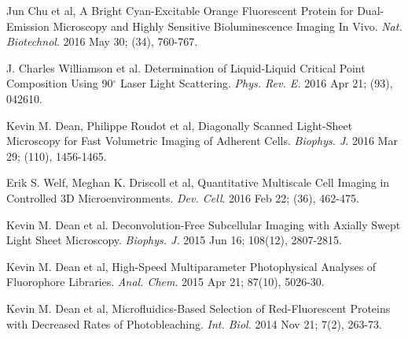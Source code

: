 \documentclass[10pt]{res}
\begin{document}
\begin{resume}
\begin{etaremune}
\item Jun Chu et al,  A Bright Cyan-Excitable Orange Fluorescent Protein for Dual-Emission Microscopy and Highly Sensitive Bioluminescence Imaging In Vivo.  {\it Nat. Biotechnol}. 2016 May 30; (34), 760-767.

\item J. Charles Williamson et al.  Determination of Liquid-Liquid Critical Point Composition Using 90$^{\circ}$ Laser Light Scattering. {\it Phys. Rev. E.}  2016 Apr 21; (93), 042610.

\item Kevin M. Dean, Philippe Roudot et al,  Diagonally Scanned Light-Sheet Microscopy for Fast Volumetric Imaging of Adherent Cells.  {\it Biophys. J}.  2016 Mar 29; (110), 1456-1465. 

\item Erik S. Welf, Meghan K. Driscoll et al, Quantitative Multiscale Cell Imaging in Controlled 3D Microenvironments. {\it Dev. Cell}.  2016 Feb 22; (36), 462-475. 

\item Kevin M. Dean et al.  Deconvolution-Free Subcellular Imaging with Axially Swept Light Sheet Microscopy.  {\it Biophys. J.} 2015 Jun 16; 108(12), 2807-2815.

\item Kevin M. Dean et al,  High-Speed Multiparameter Photophysical Analyses  of Fluorophore Libraries. {\it Anal. Chem}.  2015 Apr 21; 87(10), 5026-30.

\item Kevin M. Dean et al, Microfluidics-Based Selection of Red-Fluorescent Proteins with Decreased Rates of Photobleaching.  {\it Int. Biol.}  2014 Nov 21; 7(2), 263-73.


\end{etaremune}
\end{resume}
\end{document}
